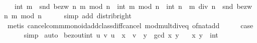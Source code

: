 \begin{isabellebody}
\ \ \isamarkupfalse%
\ \isamarkupfalse%
\ {\isachardoublequoteopen}{\isasymdots}\ {\isacharequal}{\kern0pt}\ int\ m\ {\isacharasterisk}{\kern0pt}\ snd\ {\isacharparenleft}{\kern0pt}bezw\ n\ {\isacharparenleft}{\kern0pt}m\ mod\ n{\isacharparenright}{\kern0pt}{\isacharparenright}{\kern0pt}\ {\isacharminus}{\kern0pt}\ {\isacharparenleft}{\kern0pt}int\ {\isacharparenleft}{\kern0pt}m\ mod\ n{\isacharparenright}{\kern0pt}\ {\isacharplus}{\kern0pt}\ int\ {\isacharparenleft}{\kern0pt}n\ {\isacharasterisk}{\kern0pt}\ {\isacharparenleft}{\kern0pt}m\ div\ n{\isacharparenright}{\kern0pt}{\isacharparenright}{\kern0pt}{\isacharparenright}{\kern0pt}\ {\isacharasterisk}{\kern0pt}\ snd\ {\isacharparenleft}{\kern0pt}bezw\ n\ {\isacharparenleft}{\kern0pt}m\ mod\ n{\isacharparenright}{\kern0pt}{\isacharparenright}{\kern0pt}{\isachardoublequoteclose}\isanewline
\ \ \ \ \isamarkupfalse%
\ {\isacharparenleft}{\kern0pt}simp\ add{\isacharcolon}{\kern0pt}\ distrib{\isacharunderscore}{\kern0pt}right{\isacharparenright}{\kern0pt}\isanewline
\ \ \isamarkupfalse%
\ \isamarkupfalse%
\ {\isachardoublequoteopen}{\isasymdots}\ {\isacharequal}{\kern0pt}\ {}{\isachardoublequoteclose}\isanewline
\ \ \ \ \isamarkupfalse%
\ {\isacharparenleft}{\kern0pt}metis\ cancel{\isacharunderscore}{\kern0pt}comm{\isacharunderscore}{\kern0pt}monoid{\isacharunderscore}{\kern0pt}add{\isacharunderscore}{\kern0pt}class{\isachardot}{\kern0pt}diff{\isacharunderscore}{\kern0pt}cancel\ mod{\isacharunderscore}{\kern0pt}mult{\isacharunderscore}{\kern0pt}div{\isacharunderscore}{\kern0pt}eq\ of{\isacharunderscore}{\kern0pt}nat{\isacharunderscore}{\kern0pt}add{\isacharparenright}{\kern0pt}\isanewline
\ \ \isamarkupfalse%
\ \isamarkupfalse%
\ {\isacharquery}{\kern0pt}case\isanewline
\ \ \ \ \isamarkupfalse%
\ simp\isanewline
{}\isamarkupfalse%
\ auto%
\endisatagproof
{\isafoldproof}%
%
\isadelimproof
\isanewline
%
\endisadelimproof
\isanewline
\isanewline
{}\isamarkupfalse%
\ bezout{\isacharunderscore}{\kern0pt}int{\isacharcolon}{\kern0pt}\ {\isachardoublequoteopen}{\isasymexists}u\ v{\isachardot}{\kern0pt}\ u\ {\isacharasterisk}{\kern0pt}\ x\ {\isacharplus}{\kern0pt}\ v\ {\isacharasterisk}{\kern0pt}\ y\ {\isacharequal}{\kern0pt}\ gcd\ x\ y{\isachardoublequoteclose}\isanewline
\ \ \ x\ y\ {\isacharcolon}{\kern0pt}{\isacharcolon}{\kern0pt}\ int\isanewline
%
\isadelimproof
%
\endisadelimproof
%
\isatagproof
{}\isamarkupfalse%

\end{isabellebody}
